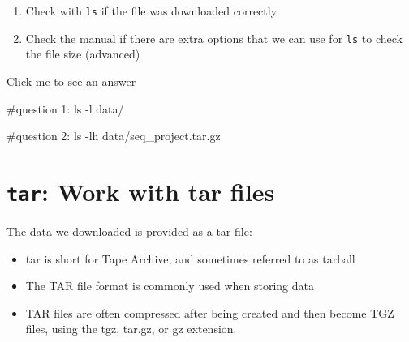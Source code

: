 \documentclass[
  letterpaper,
  DIV=11,
  numbers=noendperiod]{scrreprt}
\newenvironment{Shaded}{}{}
\newcommand{\AttributeTok}[1]{\textcolor[rgb]{0.84,0.23,0.29}{#1}}
\newcommand{\CommentTok}[1]{\textcolor[rgb]{0.42,0.45,0.49}{#1}}
\newcommand{\FunctionTok}[1]{\textcolor[rgb]{0.44,0.26,0.76}{#1}}
\newcommand{\NormalTok}[1]{\textcolor[rgb]{0.14,0.16,0.18}{#1}}
\providecommand{\tightlist}{%
  \setlength{\itemsep}{0pt}\setlength{\parskip}{0pt}}\usepackage{longtable,booktabs,array}
\begin{document}
\begin{tcolorbox}[enhanced jigsaw, bottomtitle=1mm, colframe=quarto-callout-caution-color-frame, left=2mm, leftrule=.75mm, coltitle=black, colbacktitle=quarto-callout-caution-color!10!white, toprule=.15mm, rightrule=.15mm, opacityback=0, titlerule=0mm, colback=white, breakable, bottomrule=.15mm, title=\textcolor{quarto-callout-caution-color}{\faFire}\hspace{0.5em}{Exercise}, arc=.35mm, toptitle=1mm, opacitybacktitle=0.6]

\begin{enumerate}
\def\labelenumi{\arabic{enumi}.}
\tightlist
\item
  Check with \texttt{ls} if the file was downloaded correctly
\item
  Check the manual if there are extra options that we can use for
  \texttt{ls} to check the file size (advanced)
\end{enumerate}

Click me to see an answer

\begin{Shaded}
\begin{Highlighting}[]
\CommentTok{\#question 1:}
\FunctionTok{ls} \AttributeTok{{-}l}\NormalTok{ data/}

\CommentTok{\#question 2:}
\FunctionTok{ls} \AttributeTok{{-}lh}\NormalTok{ data/seq\_project.tar.gz}
\end{Highlighting}
\end{Shaded}

\end{tcolorbox}

\section{\texorpdfstring{\texttt{tar}: Work with tar
files}{tar: Work with tar files}}\label{tar-work-with-tar-files}

The data we downloaded is provided as a tar file:

\begin{itemize}
\tightlist
\item
  tar is short for Tape Archive, and sometimes referred to as tarball
\item
  The TAR file format is commonly used when storing data
\item
  TAR files are often compressed after being created and then become TGZ
  files, using the tgz, tar.gz, or gz extension.
\end{itemize}
\end{document}
